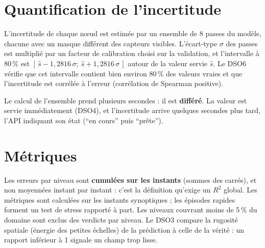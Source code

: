 \section{Quantification de l'incertitude}
L'incertitude de chaque nœud est estimée par un ensemble de 8 passes du modèle, chacune avec un
masque différent des capteurs visibles. L'écart-type $\sigma$ des passes est multiplié par un
facteur de calibration choisi sur la validation, et l'intervalle à 80\,\% est
$[\,\hat s - 1{,}2816\,\sigma ;\ \hat s + 1{,}2816\,\sigma\,]$ autour de la valeur servie
$\hat s$. Le DSO6 vérifie que cet intervalle contient bien environ 80\,\% des valeurs vraies et
que l'incertitude est corrélée à l'erreur (corrélation de Spearman positive).

Le calcul de l'ensemble prend plusieurs secondes : il est \textbf{différé}. La valeur est servie
immédiatement (DSO4), et l'incertitude arrive quelques secondes plus tard, l'API indiquant son état
(\enquote{en cours} puis \enquote{prête}).

\section{Métriques}
Les erreurs par niveau sont \textbf{cumulées sur les instants} (sommes des carrés), et non moyennées
instant par instant : c'est la définition qu'exige un $R^2$ global. Les métriques sont calculées
sur les instants synoptiques ; les épisodes rapides forment un test de stress rapporté à part.
Les niveaux couvrant moins de 5\,\% du domaine sont exclus des verdicts par niveau. Le DSO3 compare
la rugosité spatiale (énergie des petites échelles) de la prédiction à celle de la vérité : un
rapport inférieur à 1 signale un champ trop lisse.
